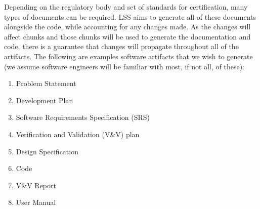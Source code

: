 \documentclass{sig-alternate-05-2015}
\newcommand{\lss}{LSS}
\begin{document}
Depending on the regulatory body and set of standards for certification, many
types of documents can be required. \lss{} aims to generate all of these
documents alongside the code, while accounting for any changes made. As the
changes will affect chunks and those chunks will be used to generate the
documentation and code, there is a guarantee that changes will propagate
throughout all of the artifacts. The following are examples software artifacts
that we wish to generate (we assume software engineers will be familiar with
most, if not all, of these):

\begin{enumerate}
\item Problem Statement
\item Development Plan
\item Software Requirements Specification (SRS)
\item Verification and Validation (V\&V) plan
\item Design Specification
\item Code
\item V\&V Report 
\item User Manual
\end{enumerate}
\end{document}
